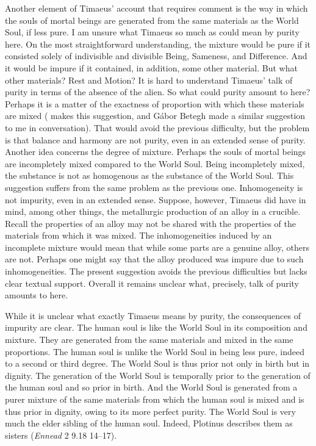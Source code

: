Another element of Timaeus' account that requires comment is the way in which the souls of mortal beings are generated from the same materials as the World Soul, if less pure. I am unsure what Timaeus so much as could mean by purity here. On the most straightforward understanding, the mixture would be pure if it consisted solely of indivisible and divisible Being, Sameness, and Difference. And it would be impure if it contained, in addition, some other material. But what other materials? Rest and Motion? It is hard to understand Timaeus' talk of purity in terms of the absence of the alien. So what could purity amount to here? Perhaps it is a matter of the exactness of proportion with which these materials are mixed (\citealt[141 n11]{Archer-Hind:1888qd} makes this suggestion, and Gábor Betegh made a similar suggestion to me in conversation). That would avoid the previous difficulty, but the problem is that balance and harmony are not purity, even in an extended sense of purity. Another idea concerns the degree of mixture. Perhaps the souls of mortal beings are incompletely mixed compared to the World Soul. Being incompletely mixed, the substance is not as homogenous as the substance of the World Soul. This suggestion suffers from the same problem as the previous one. Inhomogeneity is not impurity, even in an extended sense. Suppose, however, Timaeus did have in mind, among other things, the metallurgic production of an alloy in a crucible. Recall the properties of an alloy may not be shared with the properties of the materials from which it was mixed. The inhomogeneities induced by an incomplete mixture would mean that while some parts are a genuine alloy, others are not. Perhaps one might say that the alloy produced was impure due to such inhomogeneities. The present suggestion avoids the previous difficulties but lacks clear textual support. Overall it remains unclear what, precisely, talk of purity amounts to here.

While it is unclear what exactly Timaeus means by purity, the consequences of impurity are clear. The human soul is like the World Soul in its composition and mixture. They are generated from the same materials and mixed in the same proportions. The human soul is unlike the World Soul in being less pure, indeed to a second or third degree. The World Soul is thus prior not only in birth but in dignity. The generation of the World Soul is temporally prior to the generation of the human soul and so prior in birth. And the World Soul is generated from a purer mixture of the same materials from which the human soul is mixed and is thus prior in dignity, owing to its more perfect purity. The World Soul is very much the elder sibling of the human soul. Indeed, Plotinus describes them as sisters (\emph{Ennead} 2 9.18 14--17). 

